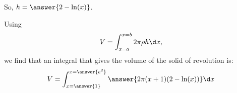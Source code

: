 \documentclass{ximera}
\begin{document}
\begin{exercise}
\begin{exercise}
\begin{exercise}
\begin{exercise}
\begin{multipleChoice}
\end{multipleChoice}   

So, $h= \answer{2-\ln(x)}$.
 \end{exercise}
           
\begin{exercise}

Using \[V = \int_{x=a}^{x=b} 2\pi \rho h \d x, \] we find that an integral that gives the volume of the solid of revolution is:            
	\[
	V= \int_{x=\answer{1}}^{x=\answer{e^2}}
	\answer{2\pi(x+1)(2-\ln(x))}\d x
	\]
\end{exercise}
\end{exercise}
\end{exercise}
\end{exercise}
\end{document}
